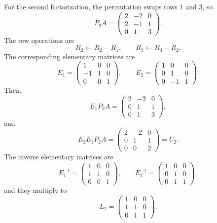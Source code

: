 \documentclass[10pt]{extarticle}
\begin{document}
\begin{enumerate}[label=(\alph*)]
For the second factorization, the permutation swaps rows $1$ and $3$, so
\[
P_2A=
\begin{pmatrix}
2 & -2 & 0\\
2 & -1 & 1\\
0 & 1 & 3
\end{pmatrix}.
\]
The row operations are
\[
R_2\leftarrow R_2-R_1,\qquad R_3\leftarrow R_3-R_2.
\]
The corresponding elementary matrices are
\[
E_1=
\begin{pmatrix}
1 & 0 & 0\\
-1 & 1 & 0\\
0 & 0 & 1
\end{pmatrix},
\qquad
E_2=
\begin{pmatrix}
1 & 0 & 0\\
0 & 1 & 0\\
0 & -1 & 1
\end{pmatrix}.
\]
Then,
\[
E_1P_2A=
\begin{pmatrix}
2 & -2 & 0\\
0 & 1 & 1\\
0 & 1 & 3
\end{pmatrix},
\]
and
\[
E_2E_1P_2A=
\begin{pmatrix}
2 & -2 & 0\\
0 & 1 & 1\\
0 & 0 & 2
\end{pmatrix}
=U_2.
\]
The inverse elementary matrices are
\[
E_1^{-1}=
\begin{pmatrix}
1 & 0 & 0\\
1 & 1 & 0\\
0 & 0 & 1
\end{pmatrix},
\qquad
E_2^{-1}=
\begin{pmatrix}
1 & 0 & 0\\
0 & 1 & 0\\
0 & 1 & 1
\end{pmatrix},
\]
and they multiply to
\[
L_2=
\begin{pmatrix}
1 & 0 & 0\\
1 & 1 & 0\\
0 & 1 & 1
\end{pmatrix}.
\]


\end{enumerate}
\end{document}
